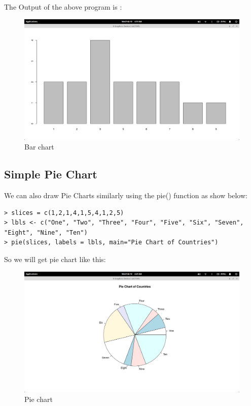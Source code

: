 \clearpage
The Output of the above program is :\\

\begin{figure}[h!]
\includegraphics[scale=0.35]{bar_plot.png}
  \centering
  \caption{Bar chart}
  \label{fig:barchart1}
\end{figure}

\clearpage

\subsection{Simple Pie Chart}
We can also draw Pie Charts similarly using the pie() function as show below:\\

\begin{lstlisting}[frame=single]
> slices = c(1,2,1,4,1,5,4,1,2,5)
> lbls <- c("One", "Two", "Three", "Four", "Five", "Six", "Seven", "Eight", "Nine", "Ten")
> pie(slices, labels = lbls, main="Pie Chart of Countries")
\end{lstlisting} 

So we will get pie chart like this:\\

 
\begin{figure}[h!]
\includegraphics[scale=0.35]{pie_plot.png}
  \centering
  \caption{Pie chart}
  \label{fig:barchart1}
\end{figure}

